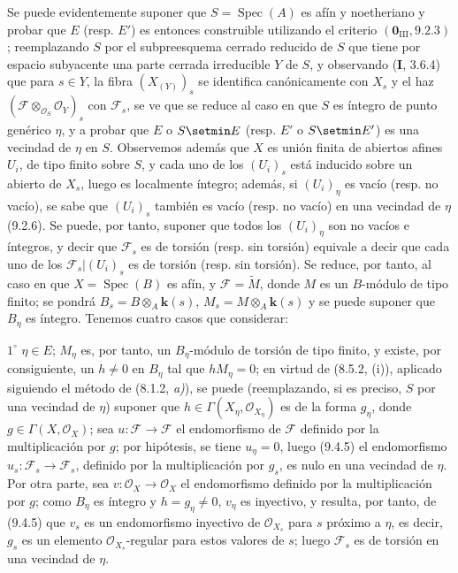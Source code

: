 Se puede evidentemente suponer que $S=\operatorname{Spec}(A)$ es afín y noetheriano y
probar que $E$ (resp. $E'$) es entonces construible utilizando el criterio
$(\mathbf 0_{\mathrm{III}},9.2.3)$; reemplazando $S$ por el subpreesquema cerrado
reducido de $S$ que tiene por espacio subyacente una parte cerrada irreducible $Y$
de $S$, y observando (\textbf{I}, 3.6.4) que para $s\in Y$, la fibra
$(X_{(Y)})_s$ se identifica canónicamente con $X_s$ y el haz
$(\mathcal F\otimes_{\mathcal O_S}\mathcal O_Y)_s$ con $\mathcal F_s$, se ve
que se reduce al caso en que $S$ es íntegro de punto genérico $\eta$, y a
probar que $E$ o $S\setmin E$ (resp. $E'$ o $S\setmin E'$) es una vecindad de $\eta$
en $S$. Observemos además que $X$ es unión finita de abiertos afines $U_i$,
de tipo finito sobre $S$, y cada uno de los $(U_i)_s$ está inducido sobre un abierto de
$X_s$, luego es localmente íntegro; además, si $(U_i)_\eta$ es vacío (resp. no
vacío), se sabe que $(U_i)_s$ también es vacío (resp. no vacío) en una vecindad
de $\eta$ (9.2.6). Se puede, por tanto, suponer que todos los $(U_i)_\eta$ son no vacíos e
íntegros, y decir que $\mathcal F_s$ es de torsión (resp. sin torsión)
equivale a decir que cada uno de los $\mathcal F_s|(U_i)_s$ es de torsión (resp.
sin torsión). Se reduce, por tanto, al caso en que $X=\operatorname{Spec}(B)$ es
afín, y $\mathcal F=\widetilde M$, donde $M$ es un $B$-módulo de tipo finito;
se pondrá $B_s=B\otimes_A \boldsymbol{k}(s)$, $M_s=M\otimes_A \boldsymbol{k}(s)$ y se puede suponer
que $B_\eta$ es íntegro. Tenemos cuatro casos que considerar:

$1^\circ$ $\eta\in E$; $M_\eta$ es, por tanto, un $B_\eta$-módulo de torsión de
tipo finito, y existe, por consiguiente, un $h\neq0$ en $B_\eta$ tal que
$hM_\eta=0$; en virtud de (8.5.2, (i)), aplicado siguiendo el método
de (8.1.2, \emph{a)}), se puede (reemplazando, si es preciso, $S$ por una vecindad
de $\eta$) suponer que $h\in\Gamma(X_\eta,\mathcal O_{X_\eta})$ es de la
forma $g_\eta$, donde $g\in\Gamma(X,\mathcal O_X)$; sea
$u:\mathcal F\to\mathcal F$ el endomorfismo de $\mathcal F$ definido por la
multiplicación por $g$; por hipótesis, se tiene $u_\eta=0$, luego (9.4.5)
el endomorfismo $u_s:\mathcal F_s\to\mathcal F_s$, definido por la multiplicación
por $g_s$, es nulo en una vecindad de $\eta$. Por otra parte, sea
$v:\mathcal O_X\to\mathcal O_X$ el endomorfismo definido por la multiplicación
por $g$; como $B_\eta$ es íntegro y $h=g_\eta\neq0$, $v_\eta$ es inyectivo,
y resulta, por tanto, de (9.4.5) que $v_s$ es un endomorfismo inyectivo de
$\mathcal O_{X_s}$ para $s$ próximo a $\eta$, es decir, $g_s$ es un
elemento $\mathcal O_{X_s}$-regular para estos valores de $s$; luego
$\mathcal F_s$ es de torsión en una vecindad de $\eta$.

